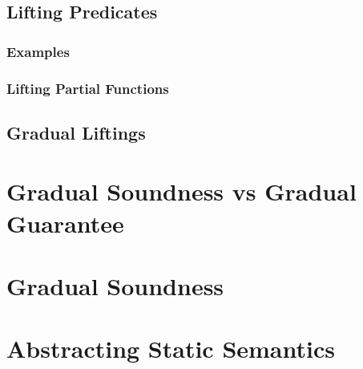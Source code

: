\subsection{Lifting Predicates}
\label{ssec:lifting-predicates}

\subsubsection{Examples}
\label{sssec:examples-lift-predicates}

%    
%        
\subsubsection{Lifting Partial Functions}
\label{sssec:lifting-partial-functions}

%    
\subsection{Gradual Liftings}
\label{sec:gradual-liftings}


\section{Gradual Soundness vs Gradual Guarantee}
\label{ssec:gradual-soundness}


\section{Gradual Soundness}
\label{sec:gradual-soundness}



\section{Abstracting Static Semantics}
\label{sec:abstracting-static-semantics}

